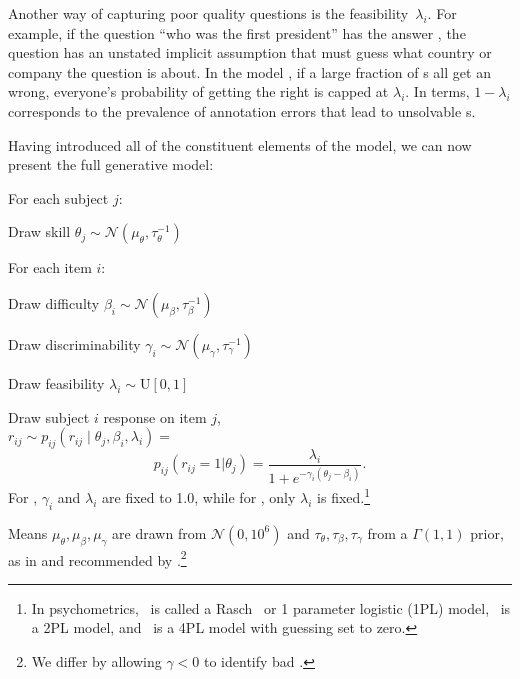 Another way of capturing poor quality questions is the
feasibility~$\lambda_i$.
%
For example, if the question ``who was the first president'' has the
answer , the question has an unstated implicit
assumption that \subjs{} must guess what country or company the
question is about.
%
In the model {\bf {}}, if a large fraction of \subj{}s all get an
\itm{} wrong, everyone's probability of getting the \itm{} right is
capped at $\lambda_i$.
%
In \nlp{} terms, $1-\lambda_i$ corresponds to the prevalence of annotation
errors that lead to unsolvable \itm{}s.


Having introduced all of the constituent elements of the model, we can
now present the full generative model:
\begin{enumerate*}
  \item For each subject $j$:
  \begin{enumerate*}
    \item Draw skill $\theta_j \sim \mathcal{N}(\mu_\theta, \tau_\theta^{-1})$
  \end{enumerate*}
  \item For each item $i$:
  \begin{enumerate*}
    \item Draw difficulty $\beta_i \sim\mathcal{N}(\mu_\beta, \tau_\beta^{-1})$
    \item Draw discriminability $\gamma_i \sim \mathcal{N}(\mu_\gamma, \tau_\gamma^{-1})$
    \item Draw feasibility $\lambda_i \sim \text{U}[0,1]$
  \end{enumerate*}
  \item Draw subject $i$ response on item $j$,\\$r_{ij} \sim p_{ij}(r_{ij} \mid \theta_j, \beta_i, \lambda_i )=$
    \begin{equation}
      p_{ij}(r_{ij}=1|\theta_j)=\frac{\lambda_i}{1+e^{-\gamma_i(\theta_j-\beta_i)}}.
      \label{eq:isicle:ours}
    \end{equation}
    For , $\gamma_i$ and $\lambda_i$ are fixed to 1.0, while for
    , only $\lambda_i$ is fixed.\footnote{In psychometrics, ~is called a Rasch~\citep{rasch1960studies} or 1 parameter logistic (1PL) model, ~is a 2PL model, and ~is a 4PL model with guessing set to zero.}
\end{enumerate*}
Means $\mu_\theta,\mu_\beta,\mu_\gamma$ are drawn from
$\mathcal{N}(0,10^6)$ and $\tau_\theta,\tau_\beta,\tau_\gamma$
from a $\Gamma(1,1)$ prior, as in \citet{lalor2019latent} and
recommended by \citet{natesan2016birt}.\footnote{We differ by
  allowing $\gamma<0$ to identify bad \itms{}.  }

